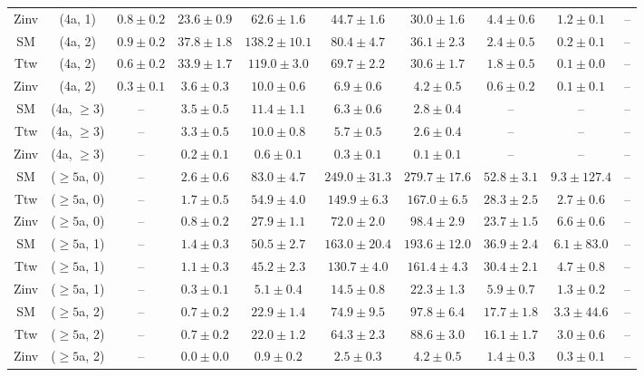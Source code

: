 \begin{table}[h!]
{\begin{tabular}{cccccccccc}
	Zinv & (4a, 1) & $0.8\pm 0.2$ & $23.6\pm 0.9$ & $62.6\pm 1.6$ & $44.7\pm 1.6$ & $30.0\pm 1.6$ & $4.4\pm 0.6$ & $1.2\pm 0.1$ & -- \\[0.5ex] 
	SM & (4a, 2) & $0.9\pm 0.2$ & $37.8\pm 1.8$ & $138.2\pm 10.1$ & $80.4\pm 4.7$ & $36.1\pm 2.3$ & $2.4\pm 0.5$ & $0.2\pm 0.1$ & -- \\[0.5ex] 
	Ttw & (4a, 2) & $0.6\pm 0.2$ & $33.9\pm 1.7$ & $119.0\pm 3.0$ & $69.7\pm 2.2$ & $30.6\pm 1.7$ & $1.8\pm 0.5$ & $0.1\pm 0.0$ & -- \\[0.5ex] 
	Zinv & (4a, 2) & $0.3\pm 0.1$ & $3.6\pm 0.3$ & $10.0\pm 0.6$ & $6.9\pm 0.6$ & $4.2\pm 0.5$ & $0.6\pm 0.2$ & $0.1\pm 0.1$ & -- \\[0.5ex] 
	SM & (4a, $\ge3$) & -- & $3.5\pm 0.5$ & $11.4\pm 1.1$ & $6.3\pm 0.6$ & $2.8\pm 0.4$ & -- & -- & -- \\[0.5ex] 
	Ttw & (4a, $\ge3$) & -- & $3.3\pm 0.5$ & $10.0\pm 0.8$ & $5.7\pm 0.5$ & $2.6\pm 0.4$ & -- & -- & -- \\[0.5ex] 
	Zinv & (4a, $\ge3$) & -- & $0.2\pm 0.1$ & $0.6\pm 0.1$ & $0.3\pm 0.1$ & $0.1\pm 0.1$ & -- & -- & -- \\[0.5ex] 
	SM & ($\ge5$a, 0) & -- & $2.6\pm 0.6$ & $83.0\pm 4.7$ & $249.0\pm 31.3$ & $279.7\pm 17.6$ & $52.8\pm 3.1$ & $9.3\pm 127.4$ & -- \\[0.5ex] 
	Ttw & ($\ge5$a, 0) & -- & $1.7\pm 0.5$ & $54.9\pm 4.0$ & $149.9\pm 6.3$ & $167.0\pm 6.5$ & $28.3\pm 2.5$ & $2.7\pm 0.6$ & -- \\[0.5ex] 
	Zinv & ($\ge5$a, 0) & -- & $0.8\pm 0.2$ & $27.9\pm 1.1$ & $72.0\pm 2.0$ & $98.4\pm 2.9$ & $23.7\pm 1.5$ & $6.6\pm 0.6$ & -- \\[0.5ex] 
	SM & ($\ge5$a, 1) & -- & $1.4\pm 0.3$ & $50.5\pm 2.7$ & $163.0\pm 20.4$ & $193.6\pm 12.0$ & $36.9\pm 2.4$ & $6.1\pm 83.0$ & -- \\[0.5ex] 
	Ttw & ($\ge5$a, 1) & -- & $1.1\pm 0.3$ & $45.2\pm 2.3$ & $130.7\pm 4.0$ & $161.4\pm 4.3$ & $30.4\pm 2.1$ & $4.7\pm 0.8$ & -- \\[0.5ex] 
	Zinv & ($\ge5$a, 1) & -- & $0.3\pm 0.1$ & $5.1\pm 0.4$ & $14.5\pm 0.8$ & $22.3\pm 1.3$ & $5.9\pm 0.7$ & $1.3\pm 0.2$ & -- \\[0.5ex] 
	SM & ($\ge5$a, 2) & -- & $0.7\pm 0.2$ & $22.9\pm 1.4$ & $74.9\pm 9.5$ & $97.8\pm 6.4$ & $17.7\pm 1.8$ & $3.3\pm 44.6$ & -- \\[0.5ex] 
	Ttw & ($\ge5$a, 2) & -- & $0.7\pm 0.2$ & $22.0\pm 1.2$ & $64.3\pm 2.3$ & $88.6\pm 3.0$ & $16.1\pm 1.7$ & $3.0\pm 0.6$ & -- \\[0.5ex] 
	Zinv & ($\ge5$a, 2) & -- & $0.0\pm 0.0$ & $0.9\pm 0.2$ & $2.5\pm 0.3$ & $4.2\pm 0.5$ & $1.4\pm 0.3$ & $0.3\pm 0.1$ & -- \\[0.5ex] 

\end{tabular}}
\end{table}
